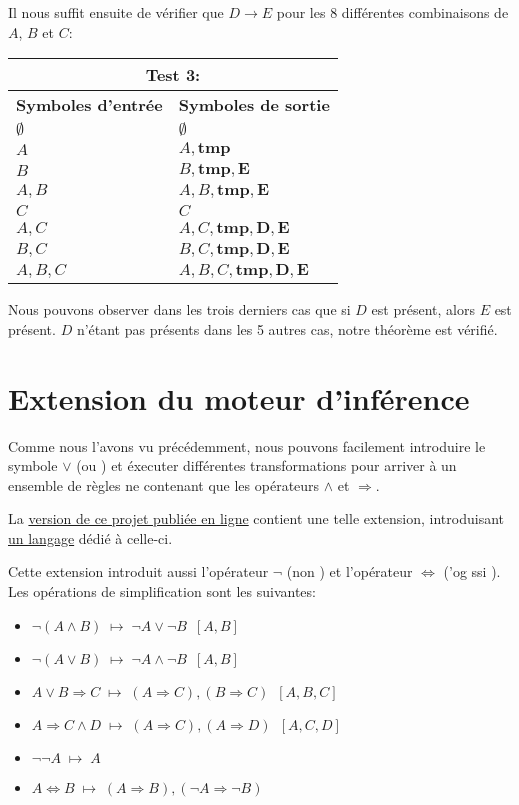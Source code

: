 \documentclass[12pt]{article}
\begin{document}
Il nous suffit ensuite de vérifier que $D \rightarrow E$ pour les 8 différentes combinaisons de $A$, $B$ et $C$:

\begin{tabular}{|p{4cm}|p{6.5cm}|}
  \hline
  \multicolumn{2}{|c|}{\textbf{Test 3:}} \\
  \hline
  \textbf{Symboles d'entrée} & \textbf{Symboles de sortie} \\
  \hline
  $\emptyset$ & $\emptyset$ \\
  \hline
  $A$ & $A, \mathbf{tmp}$ \\
  \hline
  $B$ & $B, \mathbf{tmp}, \mathbf{E}$ \\
  \hline
  $A, B$ & $A, B, \mathbf{tmp}, \mathbf{E}$ \\
  \hline
  $C$ & $C$ \\
  \hline
  $A, C$ & $A, C, \mathbf{tmp}, \mathbf{D}, \mathbf{E}$ \\
  \hline
  $B, C$ & $B, C, \mathbf{tmp}, \mathbf{D}, \mathbf{E}$ \\
  \hline
  $A, B, C$ & $A, B, C, \mathbf{tmp}, \mathbf{D}, \mathbf{E}$ \\
  \hline
\end{tabular}

Nous pouvons observer dans les trois derniers cas que si $D$ est présent, alors $E$ est présent.
$D$ n'étant pas présents dans les 5 autres cas, notre théorème est vérifié.

\section{Extension du moteur d'inférence}

Comme nous l'avons vu précédemment, nous pouvons facilement introduire le symbole $\lor$ (\og ou \fg) et éxecuter différentes transformations pour arriver à un ensemble de règles ne contenant que les opérateurs $\land$ et $\Rightarrow$.

La \href{https://github.com/adri326/lo21-project}{version de ce projet publiée en ligne} contient une telle extension, introduisant \href{https://github.com/adri326/lo21-project/blob/ext/ext/grammar.ebnf}{un langage} dédié à celle-ci.

Cette extension introduit aussi l'opérateur $\neg$ (\og non \fg) et l'opérateur $\Leftrightarrow$ ('og ssi \fg). Les opérations de simplification sont les suivantes:

\begin{itemize}
  \item $\neg(A \land B) \; \mapsto \; \neg{A} \lor \neg{B} \enspace [A, B]$
  \item $\neg(A \lor B) \; \mapsto \; \neg{A} \land \neg{B} \enspace [A, B]$
  \item $A \lor B \Rightarrow C \; \mapsto \; (A \Rightarrow C), (B \Rightarrow C) \enspace [A, B, C]$
  \item $A \Rightarrow C \land D \; \mapsto \; (A \Rightarrow C), (A \Rightarrow D) \enspace [A, C, D]$
  \item $\neg \neg A \; \mapsto \; A$
  \item $A \Leftrightarrow B \; \mapsto \; (A \Rightarrow B), (\neg A \Rightarrow \neg B)$
\end{itemize}
\end{document}
